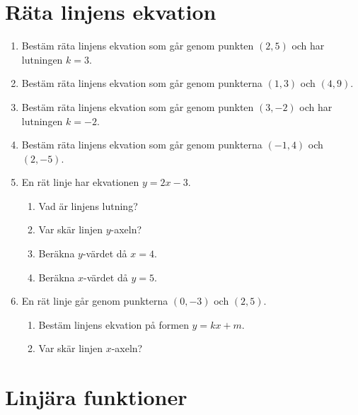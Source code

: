 \documentclass[a4paper,11pt]{article}
\begin{document}
\newpage
\section*{Räta linjens ekvation}

\begin{enumerate}[label=\textbf{\arabic*.}]
    \item Bestäm räta linjens ekvation som går genom punkten $(2, 5)$ och har lutningen $k = 3$.
    
    \item Bestäm räta linjens ekvation som går genom punkterna $(1, 3)$ och $(4, 9)$.
    
    \item Bestäm räta linjens ekvation som går genom punkten $(3, -2)$ och har lutningen $k = -2$.
    
    \item Bestäm räta linjens ekvation som går genom punkterna $(-1, 4)$ och $(2, -5)$.
    
    \item En rät linje har ekvationen $y = 2x - 3$.
    \begin{enumerate}[label=\alph*)]
        \item Vad är linjens lutning?
        \item Var skär linjen $y$-axeln?
        \item Beräkna $y$-värdet då $x = 4$.
        \item Beräkna $x$-värdet då $y = 5$.
    \end{enumerate}
    
    \item En rät linje går genom punkterna $(0, -3)$ och $(2, 5)$.
    \begin{enumerate}[label=\alph*)]
        \item Bestäm linjens ekvation på formen $y = kx + m$.
        \item Var skär linjen $x$-axeln?
    \end{enumerate}
\end{enumerate}

\section*{Linjära funktioner}
\end{document}

